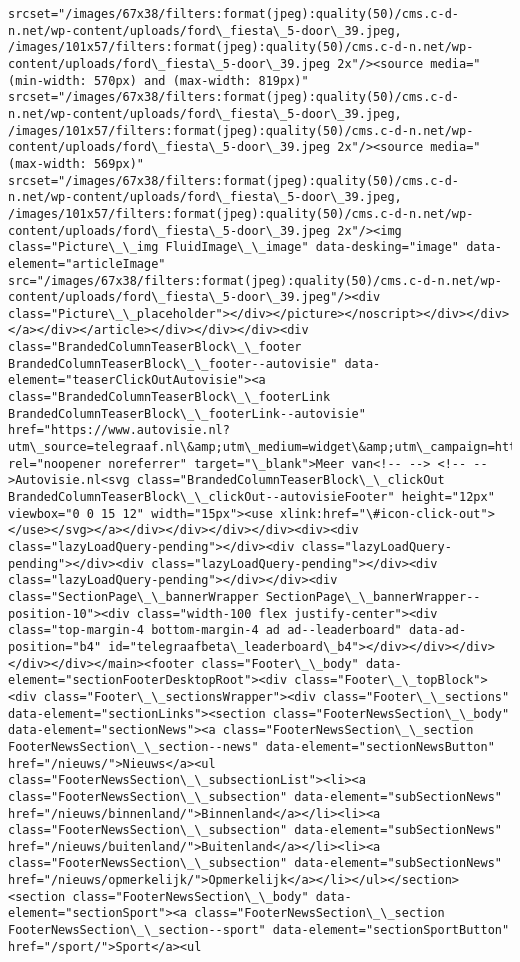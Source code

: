 \documentclass[11pt]{article}
\begin{document}
\begin{Verbatim}[commandchars=\\\{\}]
srcset="/images/67x38/filters:format(jpeg):quality(50)/cms.c-d-n.net/wp-content/uploads/ford\_fiesta\_5-door\_39.jpeg, /images/101x57/filters:format(jpeg):quality(50)/cms.c-d-n.net/wp-content/uploads/ford\_fiesta\_5-door\_39.jpeg 2x"/><source media="(min-width: 570px) and (max-width: 819px)" srcset="/images/67x38/filters:format(jpeg):quality(50)/cms.c-d-n.net/wp-content/uploads/ford\_fiesta\_5-door\_39.jpeg, /images/101x57/filters:format(jpeg):quality(50)/cms.c-d-n.net/wp-content/uploads/ford\_fiesta\_5-door\_39.jpeg 2x"/><source media="(max-width: 569px)" srcset="/images/67x38/filters:format(jpeg):quality(50)/cms.c-d-n.net/wp-content/uploads/ford\_fiesta\_5-door\_39.jpeg, /images/101x57/filters:format(jpeg):quality(50)/cms.c-d-n.net/wp-content/uploads/ford\_fiesta\_5-door\_39.jpeg 2x"/><img class="Picture\_\_img FluidImage\_\_image" data-desking="image" data-element="articleImage" src="/images/67x38/filters:format(jpeg):quality(50)/cms.c-d-n.net/wp-content/uploads/ford\_fiesta\_5-door\_39.jpeg"/><div class="Picture\_\_placeholder"></div></picture></noscript></div></div></a></div></article></div></div></div><div class="BrandedColumnTeaserBlock\_\_footer BrandedColumnTeaserBlock\_\_footer--autovisie" data-element="teaserClickOutAutovisie"><a class="BrandedColumnTeaserBlock\_\_footerLink BrandedColumnTeaserBlock\_\_footerLink--autovisie" href="https://www.autovisie.nl?utm\_source=telegraaf.nl\&amp;utm\_medium=widget\&amp;utm\_campaign=https://www.telegraaf.nl/" rel="noopener noreferrer" target="\_blank">Meer van<!-- --> <!-- -->Autovisie.nl<svg class="BrandedColumnTeaserBlock\_\_clickOut BrandedColumnTeaserBlock\_\_clickOut--autovisieFooter" height="12px" viewbox="0 0 15 12" width="15px"><use xlink:href="\#icon-click-out"></use></svg></a></div></div></div></div><div><div class="lazyLoadQuery-pending"></div><div class="lazyLoadQuery-pending"></div><div class="lazyLoadQuery-pending"></div><div class="lazyLoadQuery-pending"></div></div><div class="SectionPage\_\_bannerWrapper SectionPage\_\_bannerWrapper--position-10"><div class="width-100 flex justify-center"><div class="top-margin-4 bottom-margin-4 ad ad--leaderboard" data-ad-position="b4" id="telegraafbeta\_leaderboard\_b4"></div></div></div></div></div></main><footer class="Footer\_\_body" data-element="sectionFooterDesktopRoot"><div class="Footer\_\_topBlock"><div class="Footer\_\_sectionsWrapper"><div class="Footer\_\_sections" data-element="sectionLinks"><section class="FooterNewsSection\_\_body" data-element="sectionNews"><a class="FooterNewsSection\_\_section FooterNewsSection\_\_section--news" data-element="sectionNewsButton" href="/nieuws/">Nieuws</a><ul class="FooterNewsSection\_\_subsectionList"><li><a class="FooterNewsSection\_\_subsection" data-element="subSectionNews" href="/nieuws/binnenland/">Binnenland</a></li><li><a class="FooterNewsSection\_\_subsection" data-element="subSectionNews" href="/nieuws/buitenland/">Buitenland</a></li><li><a class="FooterNewsSection\_\_subsection" data-element="subSectionNews" href="/nieuws/opmerkelijk/">Opmerkelijk</a></li></ul></section><section class="FooterNewsSection\_\_body" data-element="sectionSport"><a class="FooterNewsSection\_\_section FooterNewsSection\_\_section--sport" data-element="sectionSportButton" href="/sport/">Sport</a><ul 
\end{Verbatim}
\end{document}
